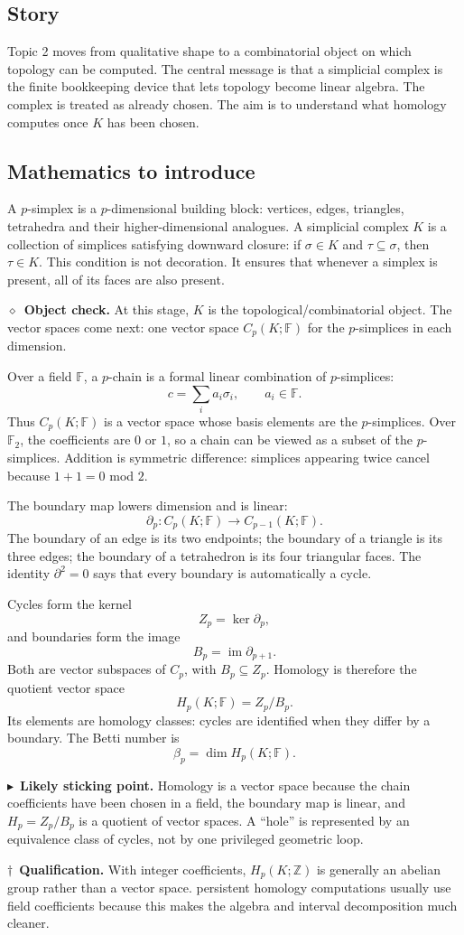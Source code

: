 \documentclass[11pt,a4paper]{article}
\newcommand{\planningbox}[2]{%
\subsection*{#1}
#2
}
\newcommand{\stickingpoint}[1]{%
\par\smallskip
\noindent\textcolor{red!65!black}{\(\blacktriangleright\)\ \textbf{Likely sticking point.}} #1
\par\smallskip
}
\newcommand{\qualification}[1]{%
\par\smallskip
\noindent\textcolor{blue!70!black}{\(\dagger\)\ \textbf{Qualification.}} #1
\par\smallskip
}
\newcommand{\objectcheck}[1]{%
\par\smallskip
\noindent\textcolor{green!45!black}{\(\diamond\)\ \textbf{Object check.}} #1
\par\smallskip
}
\begin{document}
\planningbox{Story}{
Topic 2 moves from qualitative shape to a combinatorial object on which topology
can be computed. The central message is that a simplicial complex is the finite
bookkeeping device that lets topology become linear algebra. The complex is
treated as already chosen. The aim is to understand what homology computes once
\(K\) has been chosen.
}

\planningbox{Mathematics to introduce}{
A \(p\)-simplex is a \(p\)-dimensional building block: vertices, edges,
triangles, tetrahedra and their higher-dimensional analogues. A simplicial
complex \(K\) is a collection of simplices satisfying downward closure: if
\(\sigma\in K\) and \(\tau\subseteq\sigma\), then \(\tau\in K\). This condition
is not decoration. It ensures that whenever a simplex is present, all of its
faces are also present.

\objectcheck{At this stage, \(K\) is the topological/combinatorial object.
The vector spaces come next: one vector space \(C_p(K;\mathbb F)\) for the
\(p\)-simplices in each dimension.}

Over a field \(\mathbb{F}\), a \(p\)-chain is a formal linear combination of
\(p\)-simplices:
\[
c=\sum_i a_i\sigma_i,\qquad a_i\in\mathbb F.
\]
Thus \(C_p(K;\mathbb F)\) is a vector space whose basis elements are the
\(p\)-simplices. Over \(\mathbb{F}_2\), the coefficients are \(0\) or \(1\), so
a chain can be viewed as a subset of the \(p\)-simplices. Addition is symmetric
difference: simplices appearing twice cancel because \(1+1=0\) mod \(2\).

The boundary map lowers dimension and is linear:
\[
\partial_p:C_p(K;\mathbb F)\to C_{p-1}(K;\mathbb F).
\]
The boundary of an edge is its two endpoints; the boundary of a triangle is its
three edges; the boundary of a tetrahedron is its four triangular faces. The
identity \(\partial^2=0\) says that every boundary is automatically a cycle.

Cycles form the kernel
\[
Z_p=\ker \partial_p,
\]
and boundaries form the image
\[
B_p=\operatorname{im}\partial_{p+1}.
\]
Both are vector subspaces of \(C_p\), with \(B_p\subseteq Z_p\). Homology is
therefore the quotient vector space
\[
H_p(K;\mathbb F)=Z_p/B_p.
\]
Its elements are homology classes: cycles are identified when they differ by a
boundary. The Betti number is
\[
\beta_p=\dim H_p(K;\mathbb F).
\]

\stickingpoint{Homology is a vector space because the chain coefficients have
been chosen in a field, the boundary map is linear, and \(H_p=Z_p/B_p\) is a
quotient of vector spaces. A ``hole'' is represented by an equivalence class of
cycles, not by one privileged geometric loop.}

\qualification{With integer coefficients, \(H_p(K;\mathbb Z)\) is generally an
abelian group rather than a vector space. persistent homology computations
usually use field coefficients because this makes the algebra and interval
decomposition much cleaner.}
}
\end{document}
